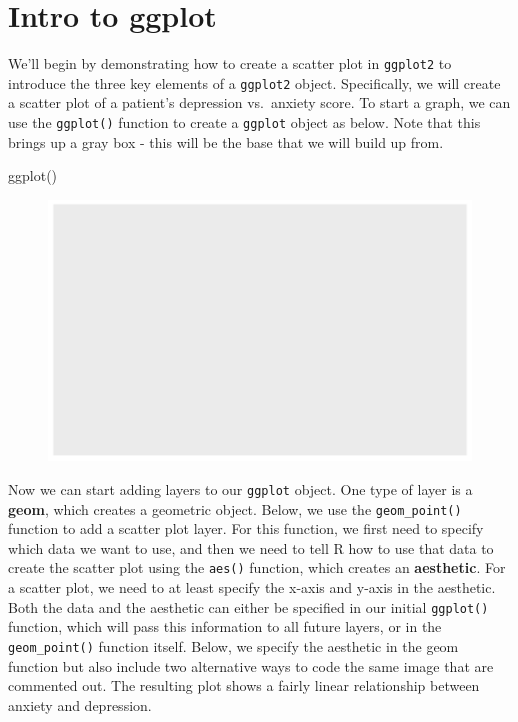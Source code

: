 \documentclass[
  letterpaper,
]{krantz}
\makeatletter
\newenvironment{Shaded}{\begin{snugshade}}{\end{snugshade}}
\newcommand{\FunctionTok}[1]{\textcolor[rgb]{0.28,0.35,0.67}{#1}}
\newcommand{\NormalTok}[1]{\textcolor[rgb]{0.00,0.23,0.31}{#1}}
\newenvironment{kframe}{%
\medskip{}
\setlength{\fboxsep}{.8em}
 \def\at@end@of@kframe{}%
 \ifinner\ifhmode%
  \def\at@end@of@kframe{\end{minipage}}%
  \begin{minipage}{\columnwidth}%
 \fi\fi%
 \def\FrameCommand##1{\hskip\@totalleftmargin \hskip-\fboxsep
 \colorbox{shadecolor}{##1}\hskip-\fboxsep
     \hskip-\linewidth \hskip-\@totalleftmargin \hskip\columnwidth}%
 \MakeFramed {\advance\hsize-\width
   \@totalleftmargin\z@ \linewidth\hsize
   \@setminipage}}%
 {\par\unskip\endMakeFramed%
 \at@end@of@kframe}
\renewenvironment{Shaded}{\begin{kframe}}{\end{kframe}}
\makeatother
\begin{document}
\hypertarget{intro-to-ggplot}{%
\section{Intro to ggplot}\label{intro-to-ggplot}}

We'll begin by demonstrating how to create a scatter plot in
\texttt{ggplot2} to introduce the three key elements of a
\texttt{ggplot2} object. Specifically, we will create a scatter plot of
a patient's depression vs.~anxiety score. To start a graph, we can use
the \texttt{ggplot()} function to create a \texttt{ggplot} object as
below. Note that this brings up a gray box - this will be the base that
we will build up from.

\begin{Shaded}
\begin{Highlighting}[]
\FunctionTok{ggplot}\NormalTok{()}
\end{Highlighting}
\end{Shaded}

\begin{figure}[H]

{\centering \includegraphics[width=1\textwidth,height=\textheight]{book/7_visualization_ggplot_files/figure-pdf/unnamed-chunk-2-1.pdf}

}

\end{figure}

Now we can start adding layers to our \texttt{ggplot} object. One type
of layer is a \textbf{geom}, which creates a geometric object. Below, we
use the \texttt{geom\_point()} function to add a scatter plot layer. For
this function, we first need to specify which data we want to use, and
then we need to tell R how to use that data to create the scatter plot
using the \texttt{aes()} function, which creates an \textbf{aesthetic}.
For a scatter plot, we need to at least specify the x-axis and y-axis in
the aesthetic. Both the data and the aesthetic can either be specified
in our initial \texttt{ggplot()} function, which will pass this
information to all future layers, or in the \texttt{geom\_point()}
function itself. Below, we specify the aesthetic in the geom function
but also include two alternative ways to code the same image that are
commented out. The resulting plot shows a fairly linear relationship
between anxiety and depression.
\end{document}
